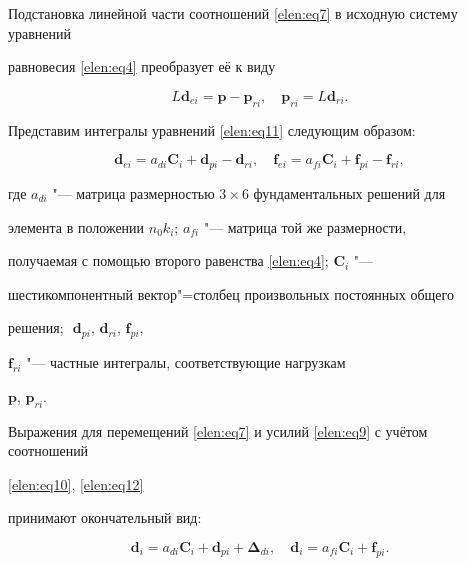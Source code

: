 Подстановка линейной части соотношений \eqref{elen:eq7} в исходную систему уравнений

равновесия \eqref{elen:eq4} преобразует её к виду

\begin{equation}

\label{elen:eq11}

L\textbf {d}_{ei} =\textbf{p}-\textbf{p}_{ri}, \quad

\textbf{p}_{ri} =L\textbf{d}_{ri}.

\end{equation}



Представим интегралы уравнений \eqref{elen:eq11} следующим образом:

\begin{equation}

\label{elen:eq12}

\textbf{d}_{ei} =a_{di} \textbf{C}_i + \textbf{d}_{pi} -

\textbf{d}_{ri}, \quad \textbf{f}_{ei}

=a_{fi} \textbf{C}_i +\textbf{f}_{pi} -\textbf{f}_{ri},

\end{equation}

где $a_{di}$ "--- матрица размерностью $3 \times 6$ фундаментальных решений для

элемента в положении $n_0k_i$; $a_{fi}$ "--- матрица той же размерности,

получаемая с помощью второго равенства \eqref{elen:eq4}; $\textbf{C}_i$ "---

шестикомпонентный вектор"=столбец произвольных постоянных общего

решения; $\textbf{ d}_{pi}$, $\textbf{d}_{ri}$, $\textbf{f}_{pi}$,

$\textbf{f}_{ri}$ "--- частные интегралы, соответствующие нагрузкам

$\textbf{p}$, $\textbf{p}_{ri}$.



Выражения для перемещений \eqref{elen:eq7} и усилий \eqref{elen:eq9} с учётом соотношений

\eqref{elen:eq10}, \eqref{elen:eq12}

принимают окончательный вид:

\begin{equation}

\label{elen:eq13}

\textbf{d}_i =a_{di} \textbf{C}_i + \textbf{d}_{pi} +\mathbf{\Delta}_{di},

\quad \textbf{d}_i =a_{fi} \textbf{C}_i +\textbf{f}_{pi}.

\end{equation}



